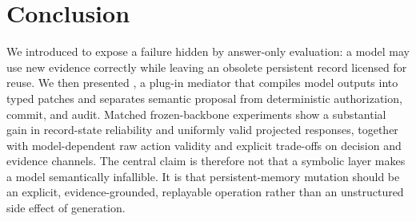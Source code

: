 \section{Conclusion}

We introduced \bench{} to expose a failure hidden by answer-only evaluation: a model may use new evidence correctly while leaving an obsolete persistent record licensed for reuse. We then presented \method{}, a plug-in mediator that compiles model outputs into typed patches and separates semantic proposal from deterministic authorization, commit, and audit. Matched frozen-backbone experiments show a substantial gain in record-state reliability and uniformly valid projected responses, together with model-dependent raw action validity and explicit trade-offs on decision and evidence channels. The central claim is therefore not that a symbolic layer makes a model semantically infallible. It is that persistent-memory mutation should be an explicit, evidence-grounded, replayable operation rather than an unstructured side effect of generation.
